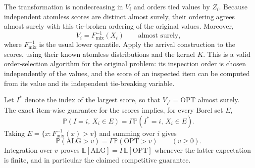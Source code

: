 \documentclass[11pt]{article}
\theoremstyle{definition}
\theoremstyle{remark}
\newcommand{\Pp}{\mathbb P}
\newcommand{\E}{\mathbb E}
\newcommand{\ALG}{\mathrm{ALG}}
\newcommand{\OPT}{\mathrm{OPT}}
\begin{document}
The transformation is nondecreasing in $V_i$ and orders tied values by
$Z_i$.  Because independent atomless scores are distinct almost surely,
their ordering agrees almost surely with this tie-broken ordering of
the original values.  Moreover,
\[
 V_i=F_{\mathrm{mix}}^{-1}(X_i)\qquad\text{almost surely},
\]
where $F_{\mathrm{mix}}^{-1}$ is the usual lower quantile.
Apply the arrival construction to the scores, using their known
atomless distributions and the kernel $K$.
This is a valid order-selection algorithm for the original problem:
its inspection order is chosen independently of the values, and the
score of an inspected item can be computed from its value and its
independent tie-breaking variable.

Let $I^*$ denote the index of the largest score, so that $V_{I^*}=\OPT$
almost surely.  The exact item-wise guarantee for the scores implies,
for every Borel set $E$,
\[
 \Pp(I=i,\,X_i\in E)
 =\Gamma\Pp(I^*=i,\,X_i\in E).
\]
Taking $E=\{x:F_{\mathrm{mix}}^{-1}(x)>v\}$ and summing over $i$ gives
\[
 \Pp(\ALG>v)=\Gamma \Pp(\OPT>v)\qquad(v\ge0).
\]
Integration over $v$ proves
$\E[\ALG]=\Gamma\E[\OPT]$ whenever the latter expectation is finite,
and in particular the claimed competitive guarantee.
\end{document}
